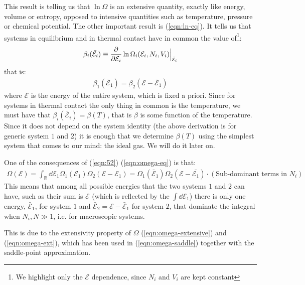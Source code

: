 \documentclass[../template.tex]{subfiles}
\begin{document}
This result is telling us that $\ln \Omega$ is an extensive quantity, exactly like energy, volume or entropy, opposed to intensive quantities such as temperature, pressure or chemical potential. The other important result is (\ref{eqn:ln-eq}). It tells us that systems in equilibrium and in thermal contact have in common the value of\footnote{We highlight only the $\mathcal{E}$ dependence, since $N_i$ and $V_i$ are kept constant}:
\begin{align*}
    \beta_i(\bar{\mathcal{E}}_i) \equiv \pdv{\mathcal{E}_i} \ln \Omega_i(\mathcal{E}_i, N_i, V_i)\Big|_{\bar{\mathcal{E}}_i}
\end{align*}
that is:
\begin{align*}
    \beta_1(\bar{\mathcal{E}}_1) = \beta_2(\mathcal{E}- \bar{\mathcal{E}}_1)
\end{align*}
where $\mathcal{E}$ is the energy of the entire system, which is fixed a priori. Since for systems in thermal contact the only thing in common is the temperature, we must have that $\beta_i(\bar{\mathcal{E}}_i) = \beta(T)$, that is $\beta$ is some function of the temperature. Since it does not depend on the system identity (the above derivation is for generic system $1$ and $2$) it is enough that we determine $\beta(T)$ using the simplest system that comes to our mind: the ideal gas. We will do it later on.

\medskip

One of the consequences of (\ref{eqn:52}) (\ref{eqn:omega-eq}) is that:
\begin{align*}
    \Omega(\mathcal{E}) = \int_{\mathbb{R}} \dd{\mathcal{E}_1} \Omega_1(\mathcal{E}_1) \Omega_2(\mathcal{E}- \mathcal{E}_1) = \Omega_1(\bar{\mathcal{E}}_1) \Omega_2 (\mathcal{E}-\bar{\mathcal{E}_1}) \cdot (\text{Sub-dominant terms in $N_i$})
\end{align*}
This means that among all possible energies that the two systems $1$ and $2$ can have, such as their sum is $\mathcal{E}$ (which is reflected by the $\int \dd{\mathcal{E}_1}$) there is only one energy, $\bar{\mathcal{E}}_1$, for system $1$ and $\bar{\mathcal{E}}_2 = \mathcal{E}- \bar{\mathcal{E}}_1$ for system $2$, that dominate the integral when $N_i, N \gg 1$, i.e. for macroscopic systems.

This is due to the extensivity property of $\Omega$ (\ref{eqn:omega-extensive}) and (\ref{eqn:omega-ext}), which has been used in (\ref{eqn:omega-saddle}) together with the saddle-point approximation.

\medskip
\end{document}

